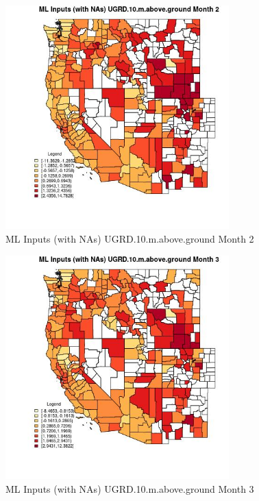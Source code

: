 \begin{figure} 
\centering  
\includegraphics[width=0.77\textwidth]{Code_Outputs/Report_ML_input_PM25_Step4_part_f_de_duplicated_aves_prioritize_24hr_obswNAs_CountyUGRD10mabovegroundmedianMonth2.jpg} 
\caption{\label{fig:Report_ML_input_PM25_Step4_part_f_de_duplicated_aves_prioritize_24hr_obswNAsCountyUGRD10mabovegroundmedianMonth2}ML Inputs (with NAs) UGRD.10.m.above.ground Month 2} 
\end{figure} 
 

\clearpage 

\begin{figure} 
\centering  
\includegraphics[width=0.77\textwidth]{Code_Outputs/Report_ML_input_PM25_Step4_part_f_de_duplicated_aves_prioritize_24hr_obswNAs_CountyUGRD10mabovegroundmedianMonth3.jpg} 
\caption{\label{fig:Report_ML_input_PM25_Step4_part_f_de_duplicated_aves_prioritize_24hr_obswNAsCountyUGRD10mabovegroundmedianMonth3}ML Inputs (with NAs) UGRD.10.m.above.ground Month 3} 
\end{figure} 
 

